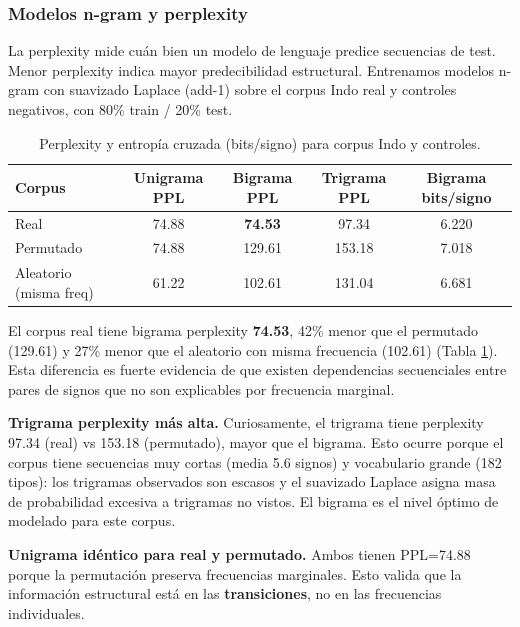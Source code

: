 \documentclass[11pt,a4paper]{article}
\newcommand{\1}{\mathbf{1}}
\numberwithin{equation}{section}
\begin{document}
\subsubsection{Modelos n-gram y perplexity}

La perplexity mide cuán bien un modelo de lenguaje predice secuencias de test. Menor perplexity indica mayor predecibilidad estructural. Entrenamos modelos n-gram con suavizado Laplace (add-1) sobre el corpus Indo real y controles negativos, con 80\% train / 20\% test.

\begin{table}[h]
\centering
\caption{Perplexity y entropía cruzada (bits/signo) para corpus Indo y controles.}
\label{tab:ngram}
\begin{tabular}{lcccc}
\toprule
Corpus & Unigrama PPL & Bigrama PPL & Trigrama PPL & Bigrama bits/signo \\
\midrule
Real & 74.88 & \textbf{74.53} & 97.34 & 6.220 \\
Permutado & 74.88 & 129.61 & 153.18 & 7.018 \\
Aleatorio (misma freq) & 61.22 & 102.61 & 131.04 & 6.681 \\
\bottomrule
\end{tabular}
\end{table}

El corpus real tiene bigrama perplexity \textbf{74.53}, 42\% menor que el permutado (129.61) y 27\% menor que el aleatorio con misma frecuencia (102.61) (Tabla \ref{tab:ngram}). Esta diferencia es fuerte evidencia de que existen dependencias secuenciales entre pares de signos que no son explicables por frecuencia marginal.

\textbf{Trigrama perplexity más alta.} Curiosamente, el trigrama tiene perplexity 97.34 (real) vs 153.18 (permutado), mayor que el bigrama. Esto ocurre porque el corpus tiene secuencias muy cortas (media 5.6 signos) y vocabulario grande (182 tipos): los trigramas observados son escasos y el suavizado Laplace asigna masa de probabilidad excesiva a trigramas no vistos. El bigrama es el nivel óptimo de modelado para este corpus.

\textbf{Unigrama idéntico para real y permutado.} Ambos tienen PPL=74.88 porque la permutación preserva frecuencias marginales. Esto valida que la información estructural está en las \textbf{transiciones}, no en las frecuencias individuales.
\end{document}
